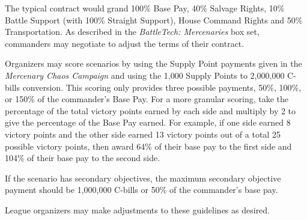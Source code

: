 The typical contract would grand 100\% Base Pay, 40\% Salvage Rights, 10\% Battle Support (with 100\% Straight Support), House Command Rights and 50\% Transportation.
As described in the \emph{BattleTech: Mercenaries} box set, commanders may negotiate to adjust the terms of their contract.

Organizers may score scenarios by using the Supply Point payments given in the \emph{Mercenary Chaos Campaign} and using the 1,000 Supply Points to 2,000,000 C-bills conversion.
This scoring only provides three possible payments, 50\%, 100\%, or 150\% of the commander's Base Pay.
For a more granular scoring, take the percentage of the total victory points earned by each side and multiply by 2 to give the percentage of the Base Pay earned.
For example, if one side earned 8 victory points and the other side earned 13 victory points out of a total 25 possible victory points, then award 64\% of their base pay to the first side and 104\% of their base pay to the second side.

If the scenario has secondary objectives, the maximum secondary objective payment should be 1,000,000 C-bills or 50\% of the commander's base pay.

League organizers may make adjustments to these guidelines as desired.
